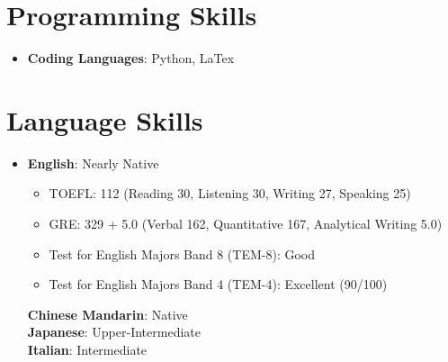 \documentclass[a4paper,11pt]{article}
\newcommand{\resumeItem}[1]{
  \item\small{
    {#1 \vspace{-2pt}}
  }
}
\newcommand{\resumeItemListStart}{\begin{itemize}}
\newcommand{\resumeItemListEnd}{\end{itemize}\vspace{-5pt}}
\begin{document}
\section{Programming Skills}
 \begin{itemize}[leftmargin=0.15in, label={}]
    \item{
     \textbf{Coding Languages}{: Python, LaTex}
     }
 \end{itemize}

\section{Language Skills}
\begin{itemize}[leftmargin=0.15in, label={}]
  \item{
   \textbf{English}{: Nearly Native}\vspace{-5pt}
      \resumeItemListStart
        \resumeItem{TOEFL: 112 (Reading 30, Listening 30, Writing 27, Speaking 25)}
        \resumeItem{GRE: 329 + 5.0 (Verbal 162, Quantitative 167, Analytical Writing 5.0)}
        \resumeItem{Test for English Majors Band 8 (TEM-8): Good}
        \resumeItem{Test for English Majors Band 4 (TEM-4): Excellent (90/100)}
      \resumeItemListEnd
  \textbf{Chinese Mandarin}{: Native} \\
  \textbf{Japanese}{: Upper-Intermediate} \\
  \textbf{Italian}{: Intermediate}
   }
\end{itemize}


\end{document}
